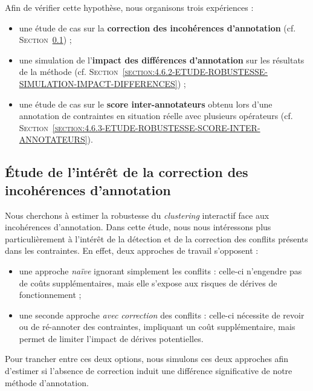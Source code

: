 	Afin de vérifier cette hypothèse, nous organisons trois expériences :
	\begin{itemize}
		\item une étude de cas sur la \textbf{correction des incohérences d'annotation} (cf. \textsc{Section~\ref{section:4.6.1-ETUDE-ROBUSTESSE-INTERET-CORRECTION-INCOHERENCES}}) ;
		\item une simulation de l'\textbf{impact des différences d'annotation} sur les résultats de la méthode (cf. \textsc{Section~\ref{section:4.6.2-ETUDE-ROBUSTESSE-SIMULATION-IMPACT-DIFFERENCES}}) ;
		\item une étude de cas sur le \textbf{score inter-annotateurs} obtenu lors d'une annotation de contraintes en situation réelle avec plusieurs opérateurs (cf. \textsc{Section~\ref{section:4.6.3-ETUDE-ROBUSTESSE-SCORE-INTER-ANNOTATEURS}}).
	\end{itemize}
	
	
	\subsection{Étude de l'intérêt de la correction des incohérences d'annotation}
	\label{section:4.6.1-ETUDE-ROBUSTESSE-INTERET-CORRECTION-INCOHERENCES}
		
		Nous cherchons à estimer la robustesse du \textit{clustering} interactif face aux incohérences d'annotation.
		Dans cette étude, nous nous intéressons plus particulièrement à l'intérêt de la détection et de la correction des conflits présents dans les contraintes.
		En effet, deux approches de travail s'opposent :
		\begin{itemize}
			\item une approche \textit{naïve} ignorant simplement les conflits : celle-ci n'engendre pas de coûts supplémentaires, mais elle s'expose aux risques de dérives de fonctionnement ;
			\item une seconde approche \textit{avec correction} des conflits : celle-ci nécessite de revoir ou de ré-annoter des contraintes, impliquant un coût supplémentaire, mais permet de limiter l'impact de dérives potentielles.
		\end{itemize}
		Pour trancher entre ces deux options, nous simulons ces deux approches afin d'estimer si l'absence de correction induit une différence significative de notre méthode d'annotation.
	
